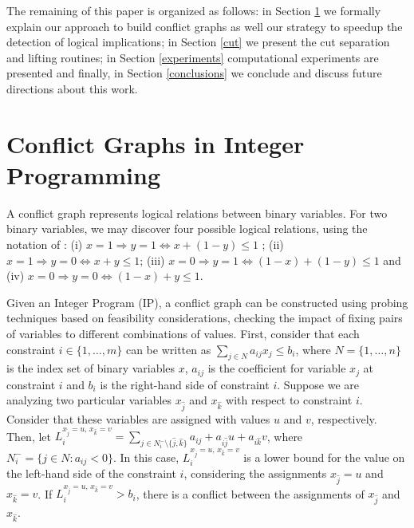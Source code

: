 \documentclass{endm}
\begin{document}
The remaining of this paper is organized as follows: in Section \ref{seccgraph} we formally explain our approach to build conflict graphs as well our strategy to speedup the detection of logical implications; in Section \ref{cut} we present the cut separation and lifting routines; in Section \ref{experiments} computational experiments are presented and finally, in Section \ref{conclusions} we conclude and discuss future directions about this work.

\section{Conflict Graphs in Integer Programming}\label{seccgraph}

A conflict graph represents logical relations between binary variables. For two binary variables, we may discover four possible logical relations, using the notation of \cite{atamturk}: (i) $x = 1 \Rightarrow y = 1 \Longleftrightarrow x + (1 - y)  \leq 1$ ; (ii) $x=1 \Rightarrow y = 0 \Longleftrightarrow x + y \leq 1$; (iii) $x = 0 \Rightarrow y = 1 \Longleftrightarrow  (1 - x) + (1 - y) \leq 1$ and (iv) $x = 0 \Rightarrow y = 0 \Longleftrightarrow (1 - x) + y \leq 1$.

Given an Integer Program (IP), a conflict graph can be constructed using probing techniques based on feasibility considerations\cite{achterberg,atamturk}, checking the impact of fixing pairs of variables to different combinations of values. First, consider that each constraint $i \in \{1,\ldots,m\}$ can be written as $\displaystyle \sum_{j \in N} a_{ij}x_{j} \leq b_{i}$, where $N=\{1,\ldots,n\}$ is the index set of binary variables $x$, $a_{ij}$ is the coefficient for variable $x_{j}$ at constraint $i$ and $b_{i}$ is the right-hand side of constraint $i$. Suppose we are analyzing two particular variables $x_{\hat{j}}$ and $x_{\hat{k}}$ with respect to constraint $i$. Consider that these variables are assigned with values $u$ and $v$, respectively. Then, let $\displaystyle
L_{i}^{x_{\hat{j}} = u,\, x_{\hat{k}} = v}=\sum_{j\in N_{i}^{-} \setminus \{\hat{j}, \hat{k}\}}a_{ij}+a_{i\hat{j}}u+a_{i\hat{k}}v $, where $N_{i}^{-} = \{j \in N : a_{ij} < 0\}$. In this case, $L_{i}^{x_{\hat{j}} = u,\, x_{\hat{k}} = v}$ is a lower bound for the value on the left-hand side  of the constraint $i$, considering the assignments $x_{\hat{j}} = u$ and $x_{\hat{k}} = v$. If $L_{i}^{x_{\hat{j}} = u,\, x_{\hat{k}} = v} > b_{i}$, there is a conflict between the assignments of $x_{\hat{j}}$ and $x_{\hat{k}}$. 
\end{document}
